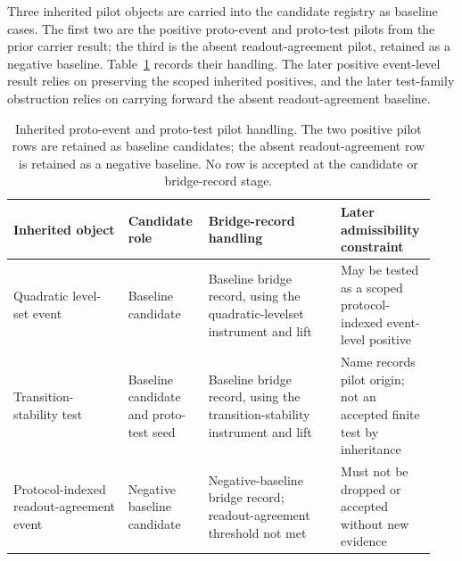 \documentclass[11pt]{article}
\theoremstyle{definition}
\begin{document}
Three inherited pilot objects are carried into the candidate registry as baseline cases. The first two are the positive proto-event and proto-test pilots from the prior carrier result; the third is the absent readout-agreement pilot, retained as a negative baseline. Table~\ref{tab:inherited-baseline-handling} records their handling. The later positive event-level result relies on preserving the scoped inherited positives, and the later test-family obstruction relies on carrying forward the absent readout-agreement baseline.

\begin{table}[t]
\centering
\small
\setlength{\tabcolsep}{4pt}
\begin{tabular}{p{0.26\linewidth}p{0.18\linewidth}p{0.30\linewidth}p{0.20\linewidth}}
\hline
\textbf{Inherited object} & \textbf{Candidate role} & \textbf{Bridge-record handling} & \textbf{Later admissibility constraint} \\
\hline
Quadratic level-set event
&
Baseline candidate
&
Baseline bridge record, using the quadratic-levelset instrument and lift
&
May be tested as a scoped protocol-indexed event-level positive
\\[0.5em]
Transition-stability test
&
Baseline candidate and proto-test seed
&
Baseline bridge record, using the transition-stability instrument and lift
&
Name records pilot origin; not an accepted finite test by inheritance
\\[0.5em]
Protocol-indexed readout-agreement event
&
Negative baseline candidate
&
Negative-baseline bridge record; readout-agreement threshold not met
&
Must not be dropped or accepted without new evidence
\\
\hline
\end{tabular}
\caption{Inherited proto-event and proto-test pilot handling. The two positive pilot rows are retained as baseline candidates; the absent readout-agreement row is retained as a negative baseline. No row is accepted at the candidate or bridge-record stage.}
\label{tab:inherited-baseline-handling}
\end{table}
\end{document}
